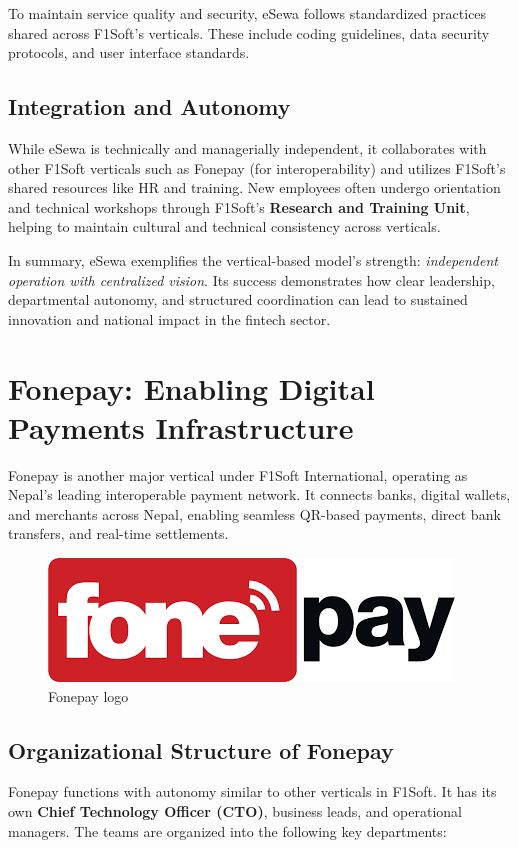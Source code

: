 \documentclass[12pt, a4paper]{report}
\begin{document}
To maintain service quality and security, eSewa follows standardized practices shared across F1Soft’s verticals. These include coding guidelines, data security protocols, and user interface standards.
\vspace{18pt}
\subsection{Integration and Autonomy}
While eSewa is technically and managerially independent, it collaborates with other F1Soft verticals such as Fonepay (for interoperability) and utilizes F1Soft’s shared resources like HR and training. New employees often undergo orientation and technical workshops through F1Soft’s \textbf{Research and Training Unit}, helping to maintain cultural and technical consistency across verticals.

\bigskip

In summary, eSewa exemplifies the vertical-based model’s strength: \textit{independent operation with centralized vision}. Its success demonstrates how clear leadership, departmental autonomy, and structured coordination can lead to sustained innovation and national impact in the fintech sector.
\newpage
\section{Fonepay: Enabling Digital Payments Infrastructure}
Fonepay is another major vertical under F1Soft International, operating as Nepal’s leading interoperable payment network. It connects banks, digital wallets, and merchants across Nepal, enabling seamless QR-based payments, direct bank transfers, and real-time settlements.
\begin{figure}[h]
\centering
\includegraphics[scale=0.5]{images/fonepay.png}
\caption{Fonepay logo}
\end{figure}


\subsection{Organizational Structure of Fonepay}

Fonepay functions with autonomy similar to other verticals in F1Soft. It has its own \textbf{Chief Technology Officer (CTO)}, business leads, and operational managers. The teams are organized into the following key departments:
\end{document}
